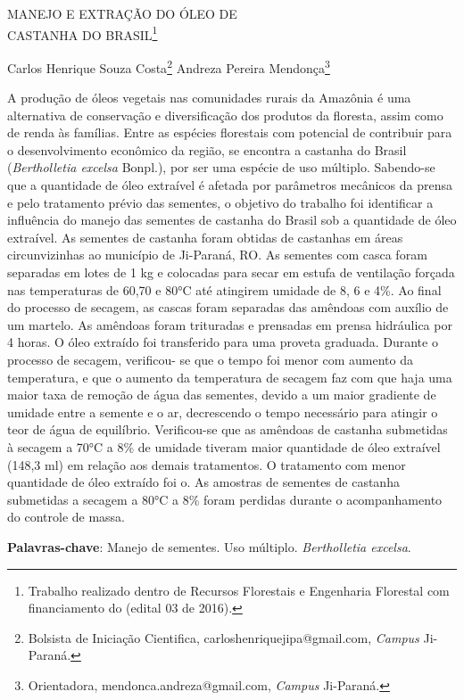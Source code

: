 \documentclass[article,12pt,onesidea,4paper,english,brazil]{abntex2}
\begin{document}
	
	
	\frenchspacing 
	
	\begin{center}
		\LARGE MANEJO E EXTRAÇÃO DO ÓLEO DE \\CASTANHA DO BRASIL\footnote{Trabalho realizado dentro de Recursos Florestais e Engenharia Florestal com financiamento do (edital 03 de 2016).}
		
		\normalsize
		Carlos Henrique Souza Costa\footnote{Bolsista de Iniciação Cientifica, carloshenriquejipa@gmail.com, \textit{Campus} Ji-Paraná.} 
		Andreza Pereira Mendonça\footnote{Orientadora, mendonca.andreza@gmail.com, \textit{Campus} Ji-Paraná.}
	\end{center}
	
	\noindent A produção de óleos vegetais nas comunidades rurais da Amazônia é uma
	alternativa de conservação e diversificação dos produtos da floresta, assim como de
	renda às famílias. Entre as espécies florestais com potencial de contribuir para o
	desenvolvimento econômico da região, se encontra a castanha do Brasil
	(\textit{Bertholletia excelsa} Bonpl.), por ser uma espécie de uso múltiplo. Sabendo-se que
	a quantidade de óleo extraível é afetada por parâmetros mecânicos da prensa e pelo
	tratamento prévio das sementes, o objetivo do trabalho foi identificar a influência do
	manejo das sementes de castanha do Brasil sob a quantidade de óleo extraível. As
	sementes de castanha foram obtidas de castanhas em áreas circunvizinhas ao
	município de Ji-Paraná, RO. As sementes com casca foram separadas em lotes de 1
	kg e colocadas para secar em estufa de ventilação forçada nas temperaturas de
	60,70 e 80°C até atingirem umidade de 8, 6 e 4\%. Ao final do processo de secagem,
	as cascas foram separadas das amêndoas com auxílio de um martelo. As amêndoas
	foram trituradas e prensadas em prensa hidráulica por 4 horas. O óleo extraído foi
	transferido para uma proveta graduada. Durante o processo de secagem, verificou-
	se que o tempo foi menor com aumento da temperatura, e que o aumento da
	temperatura de secagem faz com que haja uma maior taxa de remoção de água das
	sementes, devido a um maior gradiente de umidade entre a semente e o ar,
	decrescendo o tempo necessário para atingir o teor de água de equilíbrio. Verificou-se que as amêndoas de castanha submetidas à secagem a 70°C a 8\% de umidade	
	tiveram maior quantidade de óleo extraível (148,3 ml) em relação aos demais
	tratamentos. O tratamento com menor quantidade de óleo extraído foi o. As
	amostras de sementes de castanha submetidas a secagem a 80°C a 8\% foram
	perdidas durante o acompanhamento do controle de massa.
	
	\vspace{\onelineskip}
	
	\noindent
	\textbf{Palavras-chave}: Manejo de sementes. Uso múltiplo. \textit{Bertholletia excelsa}.
		
\end{document}

